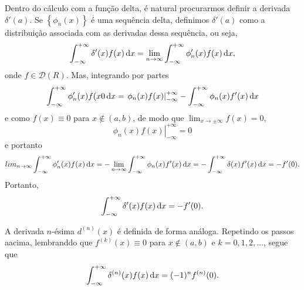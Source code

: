 Dentro do cálculo com a função delta, é natural procurarmos definir a derivada
$\delta'(a)$. Se $\left\{ \phi_n(x) \right\}$ é uma sequência delta, definimos
$\delta'(a)$ como a distribuição associada com as derivadas dessa sequência, ou
seja,
\begin{dmath*}
  \int_{-\infty}^{+\infty} \delta'(x) f(x) \vi{x} = \lim_{n \to \infty}
  \int_{-\infty}^{+\infty} \phi'_n(x) f(x) \vi{x},
\end{dmath*}
onde $f \in \mathcal{D}(R)$. Mas, integrando por partes
\begin{dmath*}
  \int_{-\infty}^{+\infty} \phi'_n(x) f(x0 \vi{x} = \left. \phi_n(x) f(x)
  \right|_{-\infty}^{+\infty} - \int_{-\infty}^{+\infty} \phi_n(x) f'(x) \vi{x}
\end{dmath*}
e como $f(x) \equiv 0$ para $x \notin (a, b)$, de modo que $\lim_{x \to
\pm\infty} f(x) = 0$,
\begin{dmath*}
  \left. \phi_n(x) f(x) \right|_{-\infty}^{+\infty} = 0
\end{dmath*}
e portanto
\begin{dmath*}
  lim_{n \to \infty} \int_{-\infty}^{+\infty} \phi'_n(x) f(x) \vi{x} = -\lim_{n
  \to \infty} \int_{-\infty}^{+\infty} \phi_n(x) f'(x) \vi{x}
  = -\int_{-\infty}^{+\infty} \delta(x) f'(x) \vi{x}
  = -f'(0).
\end{dmath*}
Portanto,
\begin{dmath*}
  \int_{-\infty}^{+\infty} \delta'(x) f(x) \vi{x} = -f'(0).
\end{dmath*}

A derivada $n$-ésima $d^{(n)}(x)$ é definida de forma análoga. Repetindo os
passos aacima, lembranddo que $f^{(k)}(x) \equiv 0$ para $x \notin (a, b)$ e $k
= 0, 1, 2, \ldots$, segue que
\begin{dmath*}
  \int_{-\infty}^{+\infty} \delta^{(n)}(x) f(x) \vi{x} = (-1)^n f^{(n)}(0).
\end{dmath*}

